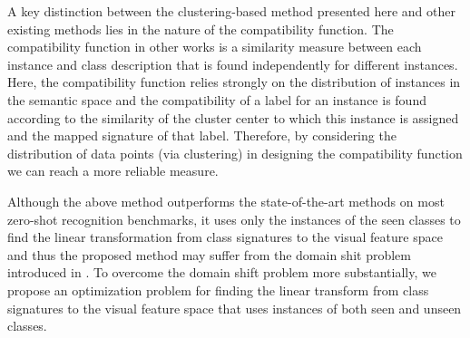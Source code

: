 \documentclass[10pt,twocolumn,letterpaper]{article}
\begin{document}


A key distinction between the clustering-based method presented here and other existing methods lies in the nature of the compatibility function. The compatibility function in
other works is a similarity measure between each instance and class description that is found independently for different instances. Here, the compatibility function relies strongly on the distribution of instances in the semantic space and the compatibility of a label for an instance is found according to the similarity of the cluster center to which this instance is assigned and the mapped signature of that label. Therefore, by considering the distribution of data points (via clustering) in designing the compatibility function we can reach a more reliable measure.

Although the above method outperforms the state-of-the-art methods on most zero-shot recognition benchmarks, it uses only the instances of the seen classes to find the linear transformation from class signatures to the visual feature space and thus the proposed method may suffer from the domain shit problem introduced in \cite{eccv14}.
To overcome the domain shift problem more substantially, we propose an optimization problem for finding the linear transform from class signatures to the visual feature space that uses instances of both seen and unseen classes.
\end{document}
